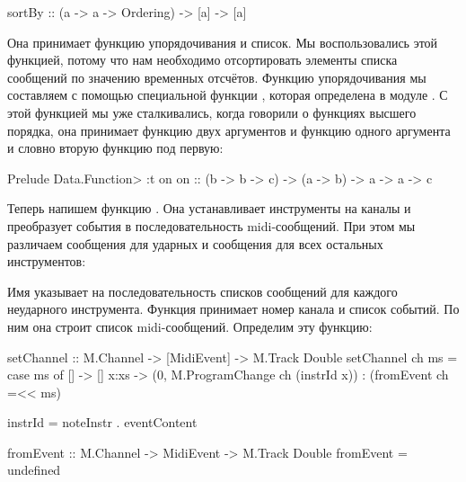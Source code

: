 \begin{code}
sortBy :: (a -> a -> Ordering) -> [a] -> [a]
\end{code}

Она принимает функцию упорядочивания и список. Мы воспользовались
этой функцией, потому что нам необходимо отсортировать элементы
списка сообщений по значению временных отсчётов. Функцию 
упорядочивания мы составляем с помощью специальной функции 
, которая определена в модуле . 
С этой функцией мы уже сталкивались, когда говорили о 
функциях высшего порядка, она принимает функцию двух аргументов
и функцию одного аргумента и словно  вторую функцию
под первую:

\begin{code}
Prelude Data.Function> :t on
on :: (b -> b -> c) -> (a -> b) -> a -> a -> c
\end{code}

Теперь напишем функцию . Она устанавливает 
инструменты на каналы и преобразует события в последовательность
midi-сообщений. При этом мы различаем сообщения для ударных
и сообщения для всех остальных инструментов:


Имя  указывает на последовательность 
списков сообщений для каждого неударного инструмента. 
Функция  принимает номер канала и список 
событий. По ним она строит список midi-сообщений.
Определим эту функцию:

\begin{code}
setChannel :: M.Channel -> [MidiEvent] -> M.Track Double
setChannel ch ms = case ms of
    []      -> []
    x:xs    -> (0, M.ProgramChange ch (instrId x)) : (fromEvent ch =<< ms)
    
instrId = noteInstr . eventContent

fromEvent :: M.Channel -> MidiEvent -> M.Track Double
fromEvent = undefined
\end{code}

